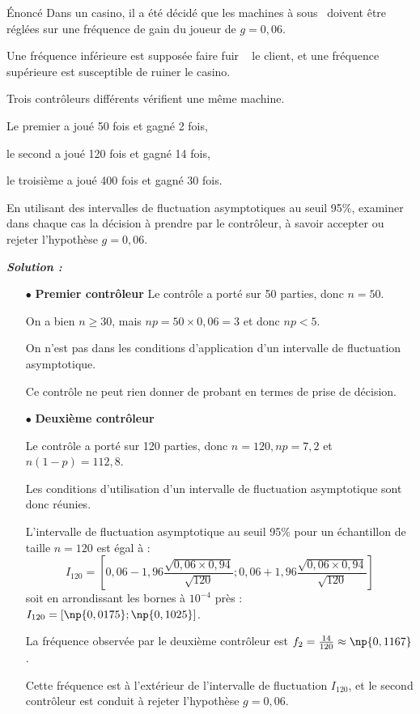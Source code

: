 \begin{spacing}{1.2}
\begin{bclogo}[couleur = blue!30 , arrondi = 0.1 ,logo = \bclampe , barre = snake , tailleOndu = 1.5]{\'Enoncé}
Dans un casino, il a été décidé que les \og machines à sous\fg~ doivent être réglées sur une fréquence de gain du joueur de $g=0,06$.

Une fréquence inférieure est supposée faire \og fuir \fg~ le client, et une fréquence supérieure est susceptible de ruiner le casino.

Trois contrôleurs différents vérifient une même machine.

Le premier a joué 50 fois et gagné 2 fois,

le second a joué 120 fois et gagné 14 fois,

le troisième a joué 400 fois et gagné 30 fois.

En utilisant des intervalles de fluctuation asymptotiques au seuil 95\%, examiner dans chaque cas la décision à prendre par le contrôleur, à savoir accepter ou rejeter l'hypothèse $g=0,06$.
\end{bclogo}

\bigskip

\textbf{\textit{Solution :}}

\begin{itemize}
\item[$\bullet$] \textbf{Premier contrôleur}
Le contrôle a porté sur 50 parties, donc $n=50$.

On a bien $n\geq 30$, mais $np=50\times 0,06=3$ et donc $np<5$.

On n'est pas dans les conditions d'application d'un intervalle de fluctuation asymptotique.

Ce contrôle ne peut rien donner de probant en termes de prise de décision.

\item[$\bullet$] \textbf{Deuxième contrôleur}

Le contrôle a porté sur 120 parties, donc $n=120, np=7,2$ et $n(1-p)=112,8$.

Les conditions d'utilisation d'un intervalle de fluctuation asymptotique sont donc réunies.

L'intervalle de fluctuation asymptotique au seuil 95\% pour un échantillon de taille $n=120$ est égal à :
\[I_{120}=\left[0,06-1,96\frac{\sqrt{0,06\times 0,94}}{\sqrt{120}};0,06+1,96\frac{\sqrt{0,06\times 0,94}}{\sqrt{120}}\right]\]
soit en arrondissant les bornes à $10^{-4}$ près : $I_{120}=[\np{0,0175};\np{0,1025}]$.

La fréquence observée par le deuxième contrôleur est $f_2=\frac{14}{120}\approx \np{0,1167}$.

Cette fréquence est à l'extérieur de l'intervalle de fluctuation $I_{120}$, et le second contrôleur est conduit à rejeter l'hypothèse $g=0,06$.


\end{itemize}
\end{spacing}
